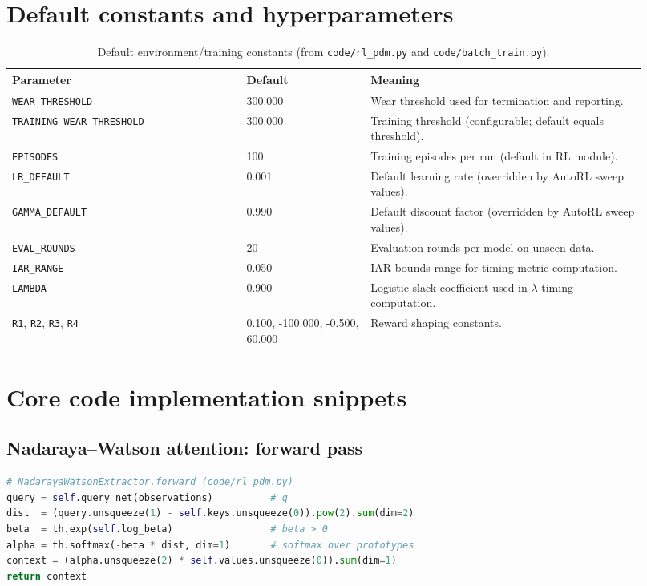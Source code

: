 \documentclass[sn-basic]{sn-jnl} %
\begin{document}
\begin{appendices}
\section{Default constants and hyperparameters}
\label{app:defaults}
\begin{table}[t]
\centering
\caption{Default environment/training constants (from \texttt{code/rl\_pdm.py} and \texttt{code/batch\_train.py}).}
\label{tab:defaults}
\begin{tabular}{p{0.34\linewidth} p{0.18\linewidth} p{0.40\linewidth}}
\toprule
\textbf{Parameter} & \textbf{Default} & \textbf{Meaning}\\
\midrule
\texttt{WEAR\_THRESHOLD} & 300.000 & Wear threshold used for termination and reporting.\\
\texttt{TRAINING\_WEAR\_THRESHOLD} & 300.000 & Training threshold (configurable; default equals threshold).\\
\texttt{EPISODES} & 100 & Training episodes per run (default in RL module).\\
\texttt{LR\_DEFAULT} & 0.001 & Default learning rate (overridden by AutoRL sweep values).\\
\texttt{GAMMA\_DEFAULT} & 0.990 & Default discount factor (overridden by AutoRL sweep values).\\
\texttt{EVAL\_ROUNDS} & 20 & Evaluation rounds per model on unseen data.\\
\texttt{IAR\_RANGE} & 0.050 & IAR bounds range for timing metric computation.\\
\texttt{LAMBDA} & 0.900 & Logistic slack coefficient used in $\lambda$ timing computation.\\
\texttt{R1}, \texttt{R2}, \texttt{R3}, \texttt{R4} & 0.100, -100.000, -0.500, 60.000 & Reward shaping constants.\\
\bottomrule
\end{tabular}
\end{table}

\section{Core code implementation snippets}
\label{app:code_snippets}

\subsection{Nadaraya--Watson attention: forward pass}
\begin{lstlisting}[language=Python,caption={NadarayaWatsonExtractor.forward (code/rl\_pdm.py)},label={lst:nw_forward}]
# NadarayaWatsonExtractor.forward (code/rl_pdm.py)
query = self.query_net(observations)          # q
dist  = (query.unsqueeze(1) - self.keys.unsqueeze(0)).pow(2).sum(dim=2)
beta  = th.exp(self.log_beta)                 # beta > 0
alpha = th.softmax(-beta * dist, dim=1)       # softmax over prototypes
context = (alpha.unsqueeze(2) * self.values.unsqueeze(0)).sum(dim=1)
return context
\end{lstlisting}


\end{appendices}
\end{document}

